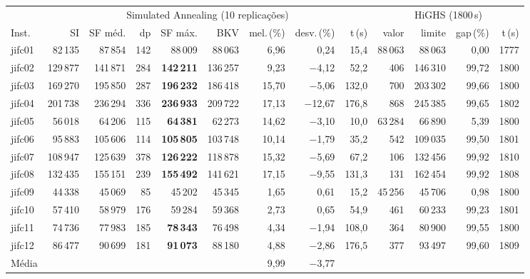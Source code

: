 \begin{tabular}{lrrrrrrrrrrrr}
\toprule
& \multicolumn{8}{c}{Simulated Annealing (10 replicações)} & \multicolumn{4}{c}{HiGHS (1800\,s)} \\ \cmidrule(lr){2-9} \cmidrule(l){10-13}
Inst. & SI & SF méd. & dp & SF máx. & BKV & mel.\,(\%) & desv.\,(\%) & t\,(s) & valor & limite & gap\,(\%) & t\,(s) \\ \midrule
jifc01 & 82\,135 & 87\,854 & 142 & 88\,009 & 88\,063 & 6{,}96 & 0{,}24 & 15{,}4 & 88\,063 & 88\,063 & 0{,}00 & 1777 \\
jifc02 & 129\,877 & 141\,871 & 284 & \textbf{142\,211} & 136\,257 & 9{,}23 & $-$4{,}12 & 52{,}2 & 406 & 146\,310 & 99{,}72 & 1800 \\
jifc03 & 169\,270 & 195\,850 & 287 & \textbf{196\,232} & 186\,418 & 15{,}70 & $-$5{,}06 & 132{,}0 & 700 & 203\,302 & 99{,}66 & 1800 \\
jifc04 & 201\,738 & 236\,294 & 336 & \textbf{236\,933} & 209\,722 & 17{,}13 & $-$12{,}67 & 176{,}8 & 868 & 245\,385 & 99{,}65 & 1802 \\
jifc05 & 56\,018 & 64\,206 & 115 & \textbf{64\,381} & 62\,273 & 14{,}62 & $-$3{,}10 & 10{,}0 & 63\,284 & 66\,890 & 5{,}39 & 1800 \\
jifc06 & 95\,883 & 105\,606 & 114 & \textbf{105\,805} & 103\,748 & 10{,}14 & $-$1{,}79 & 35{,}2 & 542 & 109\,035 & 99{,}50 & 1801 \\
jifc07 & 108\,947 & 125\,639 & 378 & \textbf{126\,222} & 118\,878 & 15{,}32 & $-$5{,}69 & 67{,}2 & 106 & 132\,456 & 99{,}92 & 1810 \\
jifc08 & 132\,435 & 155\,151 & 239 & \textbf{155\,492} & 141\,621 & 17{,}15 & $-$9{,}55 & 131{,}3 & 131 & 162\,454 & 99{,}92 & 1808 \\
jifc09 & 44\,338 & 45\,069 & 85 & 45\,202 & 45\,345 & 1{,}65 & 0{,}61 & 15{,}2 & 45\,256 & 45\,706 & 0{,}98 & 1800 \\
jifc10 & 57\,410 & 58\,979 & 176 & 59\,284 & 59\,368 & 2{,}73 & 0{,}65 & 54{,}9 & 461 & 60\,233 & 99{,}23 & 1801 \\
jifc11 & 74\,736 & 77\,983 & 185 & \textbf{78\,343} & 76\,498 & 4{,}34 & $-$1{,}94 & 108{,}0 & 364 & 80\,900 & 99{,}55 & 1800 \\
jifc12 & 86\,477 & 90\,699 & 181 & \textbf{91\,073} & 88\,180 & 4{,}88 & $-$2{,}86 & 176{,}5 & 377 & 93\,497 & 99{,}60 & 1809 \\
\midrule
Média & & & & & & 9{,}99 & $-$3{,}77 & & & & & \\
\bottomrule
\end{tabular}
